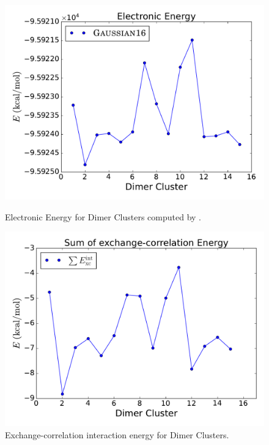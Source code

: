 \begin{figure}[h]
    \begin{minipage}[t]{0.47\textwidth}
      \centering
      \includegraphics[width=\textwidth]{4/plots/promelf/wfn_dimer_trend.pdf}
      \caption{Electronic Energy for Dimer Clusters computed by {}.}
      \label{dimer_b_w_g}
    \end{minipage}%
    \hfill
    \begin{minipage}[t]{0.47\textwidth}
      \centering
      \includegraphics[width=\textwidth]{4/plots/promelf/xc_int.pdf}
      \caption{Exchange-correlation interaction energy for Dimer Clusters.}
      \label{dimer_b_w_xc}
    \end{minipage}%
\end{figure}
